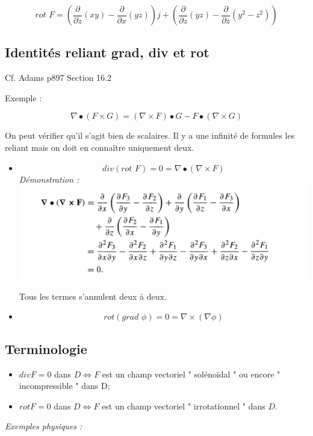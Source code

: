 \[\textit{rot }F = \left( \frac{\partial }{\partial z} (xy) -\frac{\partial }{\partial x} (yz) \right) j
+\left( \frac{\partial }{\partial z} (yz) -\frac{\partial }{\partial z} (y^2-z^2) \right)
 \]



 \subsection{Identités reliant grad, div et rot}

 Cf. Adams p897 Section 16.2

 Exemple :

 \[\nabla \bullet ( F \times G) = ( \nabla \times F) \bullet G - F \bullet(\nabla \times G ) \]

 On peut vérifier qu'il s'agit bien de scalaires. Il y a une infinité de formules les reliant mais on doit en connaître uniquement deux.

 \begin{itemize}
 \item
 \[\textit{div}(\textit{rot } F ) = 0 = \nabla \bullet ( \nabla \times F ) \]
\textit{Démonstration :} \\

 \includegraphics[scale=0.7]{image1.png}

 Tous les termes s'annulent deux à deux.
 \item
 \[\textit{rot} ( \textit{grad }\phi) =0 = \nabla \times ( \nabla \phi ) \]

 \end{itemize}
 \subsection{Terminologie}
\begin{itemize}


\item
 $div F = 0$ dans $D \Leftrightarrow F$ est un champ vectoriel " solénoïdal " ou encore " incompressible " dans D;

\item $rot F = 0$ dans $D \Leftrightarrow F$ est un champ vectoriel " irrotationnel " dans $D$.

\end{itemize}
\textit{ Exemples physiques :} \\

